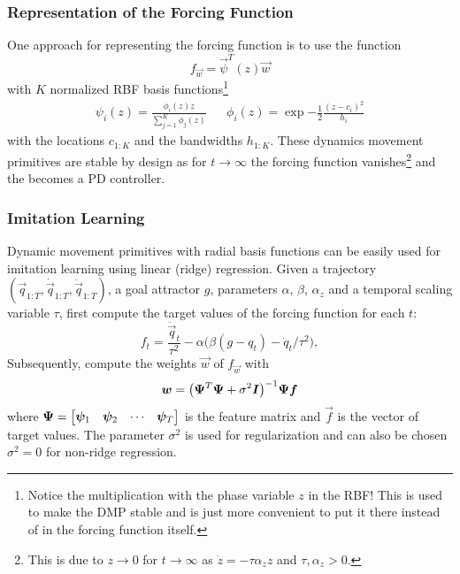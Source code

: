 			\subsubsection{Representation of the Forcing Function}
				One approach for representing the forcing function is to use the function
				\begin{equation*}
					f_{\vec{w}} = \vec{\psi}^T(z) \vec{w}
				\end{equation*}
				with \(K\) normalized RBF basis functions\footnote{Notice the multiplication with the phase variable \(z\) in the RBF! This is used to make the DMP stable and is just more convenient to put it there instead of in the forcing function itself.}
				\begin{align}
					\psi_i(z) = \frac{\phi_i(z) z}{\sum_{j = 1}^{K} \phi_j(z)}
					 &  &
					\phi_i(z) = \exp{ -\frac{1}{2} \frac{(z - c_i)^2}{h_i} }  \label{eq:normRbf}
				\end{align}
				with the locations \(c_{1:K}\) and the bandwidths \(h_{1:K}\). These dynamics movement primitives are stable by design as for \( t \to \infty \) the forcing function vanishes\footnote{This is due to \( z \to 0 \) for \( t \to \infty \) as \( \dot{z} = -\tau \alpha_z z \) and \( \tau, \alpha_z > 0 \).} and the  becomes a PD controller.

			\subsubsection{Imitation Learning}
				Dynamic movement primitives with radial basis functions can be easily used for imitation learning using linear (ridge) regression. Given a trajectory \( (\vec{q}_{1:T}, \dot{\vec{q}}_{1:T}, \ddot{\vec{q}}_{1:T}) \), a goal attractor \(g\), parameters \(\alpha\), \(\beta\), \(\alpha_z\) and a temporal scaling variable \(\tau\), first compute the target values of the forcing function for each \(t\):
				\begin{equation*}
					f_t = \frac{\ddot{\vec{q}}_t}{\tau^2} - \alpha \big( \beta (g - q_t) - \dot{q}_t / \tau^2 \big),
				\end{equation*}
				Subsequently, compute the weights \(\vec{w}\) of \( f_{\vec{w}} \) with
				\begin{equation*}
					\bm{w} = \big( \bm{\Psi}^T \bm{\Psi} + \sigma^2 \bm{I} \big)^{-1} \bm{\Psi} \bm{f}
				\end{equation*}
				where \( \bm{\Psi} = \begin{bmatrix} \bm{\psi}_1 & \bm{\psi}_2 & \cdots & \bm{\psi}_T \end{bmatrix} \) is the feature matrix and \(\vec{f}\) is the vector of target values. The parameter \(\sigma^2\) is used for regularization and can also be chosen \( \sigma^2 = 0 \) for non-ridge regression.

